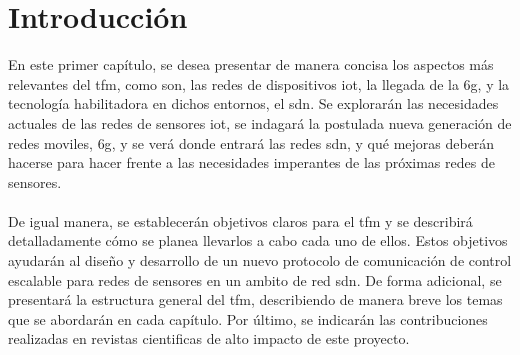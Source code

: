 
\chapter{Introducción}
\label{ch:intro}

\par
En este primer capítulo, se desea presentar de manera concisa los aspectos más relevantes del \gls{tfm}, como son, las redes de dispositivos \gls{iot}, la llegada de la \gls{6g}, y la tecnología habilitadora en dichos entornos, el \gls{sdn}. Se explorarán las necesidades actuales de las redes de sensores \gls{iot}, se indagará la postulada nueva generación de redes moviles, \gls{6g}, y se verá donde entrará las redes \gls{sdn}, y qué mejoras deberán hacerse para hacer frente a las necesidades imperantes de las próximas redes de sensores.\\
\\
De igual manera, se establecerán objetivos claros para el \gls{tfm} y se describirá detalladamente cómo se planea llevarlos a cabo cada uno de ellos. Estos objetivos ayudarán al diseño y desarrollo de un nuevo protocolo de comunicación de control escalable para redes de sensores en un ambito de red \gls{sdn}. De forma adicional, se presentará la estructura general del \gls{tfm}, describiendo de manera breve los temas que se abordarán en cada capítulo. Por último, se indicarán las contribuciones realizadas en revistas cientificas de alto impacto de este proyecto.

